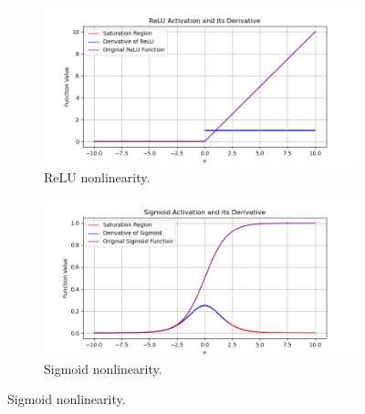 \begin{figure}[htbp]
  \centering
  \begin{subfigure}{0.49\textwidth}
    \includegraphics[width=\linewidth]{images/methods_mono/batch_norm/relu.png}
    
    \caption{ReLU nonlinearity.}
    \label{fig:image1}
  \end{subfigure}
  \hfill
  \begin{subfigure}{0.49\textwidth}
    \includegraphics[width=\linewidth]{images/methods_mono/batch_norm/sigmoid.png}
    \caption{Sigmoid nonlinearity.}
    \label{fig:image2}
  \end{subfigure}

  \medskip


\end{figure}
